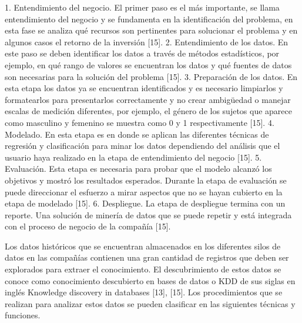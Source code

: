 1.	Entendimiento del negocio. El primer paso es el más importante, se llama entendimiento del negocio y se fundamenta en la identificación del problema, en esta fase se analiza qué recursos son pertinentes para solucionar el problema y en algunos casos el retorno de la inversión [15].
2.	Entendimiento de los datos.  En este paso se deben identificar los datos a través de métodos estadísticos, por ejemplo, en qué rango de valores se encuentran los datos y qué fuentes de datos son necesarias para la solución del problema [15].
3.	Preparación de los datos. En esta etapa los datos ya se encuentran identificados y es necesario limpiarlos y formatearlos para presentarlos correctamente y no crear ambigüedad o manejar escalas de medición diferentes, por ejemplo, el género de los sujetos que aparece como masculino y femenino se muestra como 0 y 1 respectivamente [15].
4.	Modelado. En esta etapa es en donde se aplican las diferentes técnicas de regresión y clasificación para minar los datos dependiendo del análisis que el usuario haya realizado en la etapa de entendimiento del negocio [15].
5.	Evaluación. Esta etapa es necesaria para probar que el modelo alcanzó los objetivos y mostró los resultados esperados. Durante la etapa de evaluación se puede direccionar el esfuerzo a mirar aspectos que no se hayan cubierto en la etapa de modelado [15].
6.	Despliegue. La etapa de despliegue termina con un reporte. Una solución de minería de datos que se puede repetir y está integrada con el proceso de negocio de la compañía [15].

Los datos históricos que se encuentran almacenados en los diferentes silos de datos en las compañías contienen una gran cantidad de registros que deben ser explorados para extraer el conocimiento. El descubrimiento de estos datos se conoce como conocimiento descubierto en bases de datos o KDD de sus siglas en inglés Knowledge discovery in databases [13], [15]. Los procedimientos que se realizan para analizar estos datos se pueden clasificar en las siguientes técnicas y funciones.

